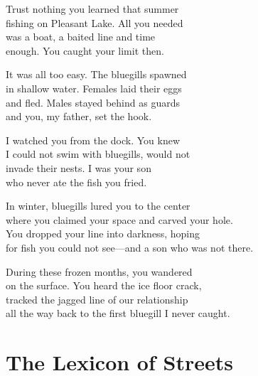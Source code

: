 \documentclass[twoside,10pt]{book}
\begin{document}
Trust nothing you learned that summer\\
fishing on Pleasant Lake. All you needed\\
was a boat, a baited line and time\\
enough. You caught your limit then.

It was all too easy. The bluegills spawned\\
in shallow water. Females laid their eggs\\
and fled. Males stayed behind as guards\\
and you, my father, set the hook.

I watched you from the dock. You knew\\
I could not swim with bluegills, would not\\
invade their nests. I was your son\\
who never ate the fish you fried.

In winter, bluegills lured you to the center\\
where you claimed your space and carved your hole.\\
You dropped your line into darkness, hoping\\
for fish you could not see---and a son who was not there.

During these frozen months, you wandered\\
on the surface. You heard the ice floor crack,\\
tracked the jagged line of our relationship\\
all the way back to the first bluegill I never caught.


\clearpage
\section{The Lexicon of Streets}
\end{document}
